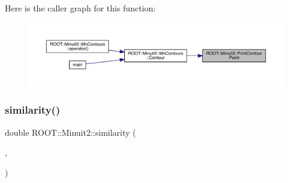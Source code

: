Here is the caller graph for this function\+:
\nopagebreak
\begin{figure}[H]
\begin{center}
\leavevmode
\includegraphics[width=350pt]{d6/d3a/namespaceROOT_1_1Minuit2_a4075583a4cbc4a719ed2ec32e1d76bbf_icgraph}
\end{center}
\end{figure}
\mbox{\label{namespaceROOT_1_1Minuit2_aa54e0f1ba5ca00da1b32710322034fee}} 
\subsubsection{\texorpdfstring{similarity()}{similarity()}}
{\footnotesize\ttfamily double R\+O\+O\+T\+::\+Minuit2\+::similarity (\begin{DoxyParamCaption}\item[{const \mbox{\hyperlink{classROOT_1_1Minuit2_1_1LAVector}{L\+A\+Vector}} \&}]{,  }\item[{const \mbox{\hyperlink{classROOT_1_1Minuit2_1_1LASymMatrix}{L\+A\+Sym\+Matrix}} \&}]{ }\end{DoxyParamCaption})}

